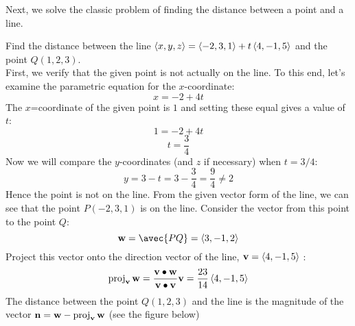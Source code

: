 \documentclass[handout]{ximera}
\begin{document}
Next, we solve the classic problem of finding the distance between a point and a line.

\begin{example}[Example 4]
Find the distance between the line $\left\langle x,y,z\right\rangle = \left\langle -2,3,1\right\rangle + t \left\langle 4,-1,5\right\rangle$ and the point $Q(1, 2, 3)$.\\
First, we verify that the given point is not actually on the line. 
To this end, let's examine the parametric equation for the $x$-coordinate:
\[
x = -2 + 4t
\]
The $x$=coordinate of the given point is $1$ and setting these equal gives a value of $t$:
\[
1 = -2 + 4t
\]
\[
t = \frac34
\]
Now we will compare the $y$-coordinates (and $z$ if necessary) when $t= 3/4$:
\[
y = 3 - t = 3 -\frac34 = \frac94 \neq 2
\]
Hence the point is not on the line.
From the given vector form of the line, we can see that the point $P(-2, 3, 1)$ is on the line.  
Consider the vector from this point to the point $Q$:
\[
\vec{w} = \avec{PQ} = \vector{3, -1, 2}
\]
Project this vector onto the direction vector of the line, $\mathbf{v} = \left\langle 4, -1, 5\right\rangle$ :
\[
\operatorname{proj}_{\mathbf{v}}\mathbf{w} = \frac{\mathbf{v} \bullet \mathbf{w}}{\mathbf{v} \bullet \mathbf{v}}\mathbf{v} = \frac{23}{14}\left\langle 4,-1,5\right\rangle
\]
The distance between the point $Q(1, 2, 3)$ and the line is the magnitude of the 
vector $\mathbf{n} = \mathbf{w} - \operatorname{proj}_{\mathbf{v}}\mathbf{w}$ (see the figure below)

\begin{image}
\end{image}

\begin{image}
\end{image}




\end{example}
\end{document}
